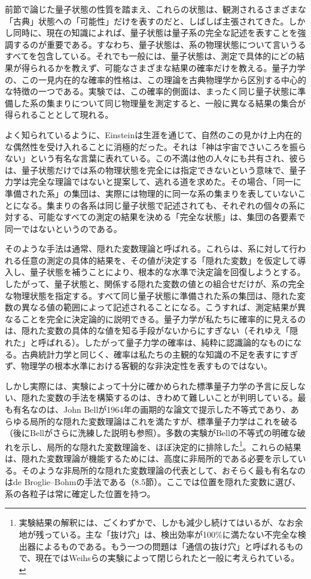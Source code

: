 前節で論じた量子状態の性質を踏まえ、これらの状態は、観測されるさまざまな「古典」状態への「可能性」だけを表すのだと、しばしば主張されてきた。しかし同時に、現在の知識によれば、量子状態は量子系の完全な記述を表すことを強調するのが重要である。すなわち、量子状態は、系の物理状態について言いうるすべてを包含している。それでも一般には、量子状態は、測定で具体的にどの結果が得られるかを教えず、可能なさまざまな結果の確率だけを教える。量子力学の、この一見内在的な確率的性格は、この理論を古典物理学から区別する中心的な特徴の一つである。実験では、この確率的側面は、まったく同じ量子状態に準備した系の集まりについて同じ物理量を測定すると、一般に異なる結果の集合が得られることとして現れる。

\hypertarget{srcpage:17}{}\label{srcpage:17}
よく知られているように、Einsteinは生涯を通じて、自然のこの見かけ上内在的な偶然性を受け入れることに消極的だった\cite{ref029}。それは「神は宇宙でさいころを振らない」という有名な言葉に表れている。この不満は他の人々にも共有され、彼らは、量子状態だけでは系の物理状態を完全には指定できないという意味で、量子力学は完全な理論ではないと提案して、逃れる道を求めた。その場合、「同一に準備された系」の集団は、実際には物理的に同一な系の集まりを表していないことになる。集まりの各系は同じ量子状態で記述されても、それぞれの個々の系に対する、可能なすべての測定の結果を決める「完全な状態」は、集団の各要素で同一ではないというのである。

そのような手法は通常、隠れた変数理論と呼ばれる。これらは、系に対して行われる任意の測定の具体的結果を、その値が決定する「隠れた変数」を仮定して導入し、量子状態を補うことにより、根本的な水準で決定論を回復しようとする。したがって、量子状態と、関係する隠れた変数の値との組合せだけが、系の完全な物理状態を指定する。すべて同じ量子状態に準備された系の集団は、隠れた変数の異なる値の範囲によって記述されることになる。こうすれば、測定結果が異なることを完全に決定論的に説明できる。量子力学が私たちに確率的に見えるのは、隠れた変数の具体的な値を知る手段がないからにすぎない（それゆえ「隠れた」と呼ばれる）。したがって量子力学の確率は、純粋に認識論的なものになる。古典統計力学と同じく、確率は私たちの主観的な知識の不足を表すにすぎず、物理学の根本水準における客観的な非決定性を表すものではない。

しかし実際には、実験によって十分に確かめられた標準量子力学の予言に反しない、隠れた変数の手法を構築するのは、きわめて難しいことが判明している。最も有名なのは、John Bellが1964年の画期的な論文で提示した不等式であり、あらゆる局所的な隠れた変数理論はこれを満たすが、標準量子力学はこれを破る\cite{ref030}（後にBellがさらに洗練した説明\cite{ref027,ref031}も参照）。多数の実験がBellの不等式の明確な破れを示し、局所的な隠れた変数理論を、ほぼ決定的に排除した\footnote{実験結果の解釈には、ごくわずかで、しかも減少し続けてはいるが、なお余地が残っている。主な「抜け穴」は、検出効率が100\%に満たない不完全な検出器によるものである\cite{ref032}。もう一つの問題は「通信の抜け穴」と呼ばれるもので、現在ではWeihsらの実験\cite{ref033}によって閉じられたと一般に考えられている。}。これらの結果は、隠れた変数理論が機能するためには、高度に非局所的である必要を示している。そのような非局所的な隠れた変数理論の代表として、おそらく最も有名なのはde Broglie--Bohmの手法\cite{ref034,ref035,ref036,ref037}である（8.5節）。ここでは位置を隠れた変数に選び、系の各粒子は常に確定した位置を持つ。

